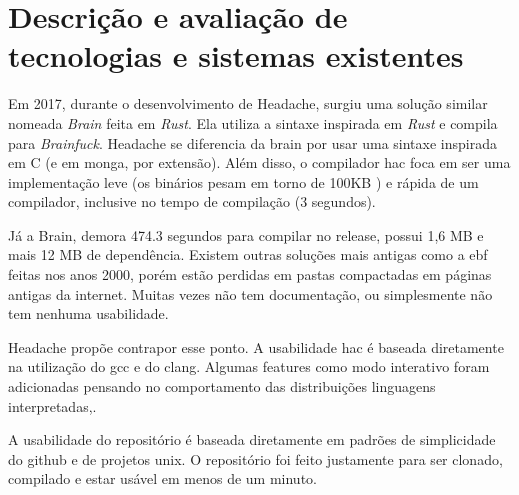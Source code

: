 \section{Descrição e avaliação de tecnologias e sistemas existentes}
Em 2017, durante o desenvolvimento de Headache, surgiu uma solução similar nomeada \textit{Brain} feita em \textit{Rust}. Ela utiliza a sintaxe inspirada em \textit{Rust} e compila para \textit{Brainfuck}. Headache se diferencia da brain por usar uma sintaxe inspirada em C  (e em monga, por extensão). Além disso, o compilador hac foca em ser uma implementação leve (os binários pesam em torno de 100KB ) e rápida de um compilador, inclusive no tempo de compilação (3 segundos). 

Já a Brain, demora 474.3 segundos para compilar no release,  possui 1,6 MB e mais 12 MB de dependência. 
Existem outras soluções mais antigas como a ebf feitas nos anos 2000, porém estão perdidas em pastas compactadas em páginas antigas da internet. Muitas vezes não tem documentação, ou simplesmente não tem nenhuma usabilidade.

Headache propõe contrapor esse ponto. A usabilidade hac é baseada diretamente na utilização do gcc e do clang. Algumas features como modo interativo foram adicionadas pensando no comportamento das distribuições linguagens interpretadas,.

A usabilidade do repositório é baseada diretamente em padrões de simplicidade do github e de projetos unix. O repositório foi feito justamente para ser clonado, compilado e estar usável em menos de um minuto.
